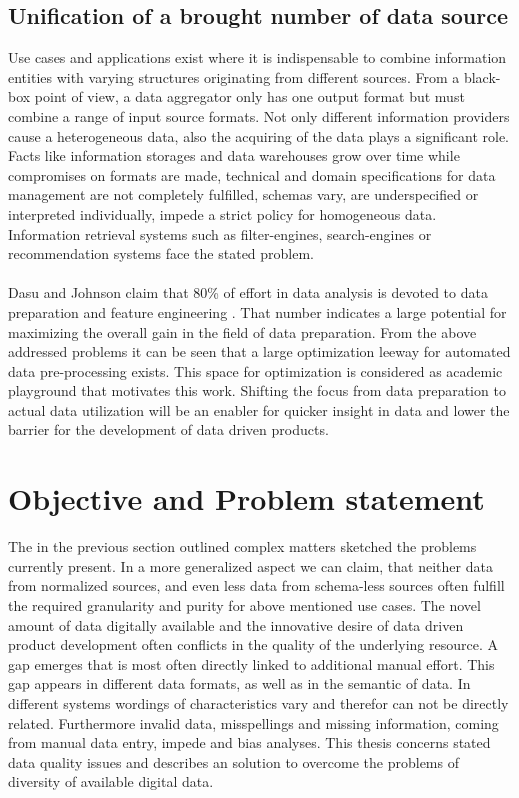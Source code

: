 \subsection{Unification of a brought number of data source} 

Use cases and applications exist where it is indispensable to combine information entities with varying structures originating from different sources. From a black-box point of view, a data aggregator only has one output format but must combine a range of input source formats. Not only different information providers cause a heterogeneous data, also the acquiring of the data plays a significant role. Facts like information storages and data warehouses grow over time while compromises on formats are made, technical and domain specifications for data management are not completely fulfilled, schemas vary, are underspecified or interpreted individually, impede a strict policy for homogeneous data. Information retrieval systems such as filter-engines, search-engines or recommendation systems face the stated problem. 
\\\\
Dasu and Johnson claim that 80\% of effort in data analysis is devoted to data preparation and feature engineering
. That number indicates a large potential for maximizing the overall gain in the field of data preparation. From the above addressed problems it can be seen that a large optimization leeway for automated data pre-processing exists. This space for optimization is considered as academic playground that motivates this work. Shifting the focus from data preparation to actual data utilization will be an enabler for quicker insight in data and lower the barrier for the development of data driven products.

\section{Objective and Problem statement\label{sec:objective}}
The in the previous section outlined complex matters sketched the problems currently present. In a more generalized aspect we can claim, that neither data from normalized sources, and even less data from schema-less sources often fulfill the required granularity and purity for above mentioned use cases. The novel amount of data digitally available and the innovative desire of data driven product development often conflicts in the quality of the underlying resource. A gap emerges that is most often directly linked to additional manual effort. This gap appears in different data formats, as well as in the semantic of data. In different systems wordings of characteristics vary and therefor can not be directly related. Furthermore invalid data, misspellings and missing information, coming from manual data entry, impede and bias analyses. This thesis concerns stated data quality issues and describes an solution to overcome the problems of diversity of available digital data.  

